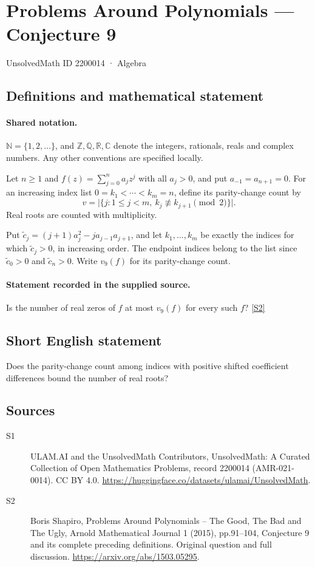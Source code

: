 \documentclass[11pt]{article}
\newcommand{\sref}[2]{\hyperlink{source:#1:#2}{[S#2]}}
\begin{document}
\setcounter{section}{2200013}
\section{Problems Around Polynomials — Conjecture 9}\label{2200014}
{\small\sffamily UnsolvedMath ID 2200014 · Algebra}
\subsection{Definitions and mathematical statement}

\paragraph{Shared notation.}$\mathbb N=\{1,2,\ldots\}$, and $\mathbb Z,\mathbb Q,\mathbb R,\mathbb C$ denote the integers, rationals, reals and complex numbers. Any other conventions are specified locally.


Let $n\geq1$ and $f(z)=\sum_{j=0}^n a_jz^j$ with all $a_j>0$, and put $a_{-1}=a_{n+1}=0$. For an increasing index list $0=k_1<\cdots<k_m=n$, define its parity-change count by
\[v=\bigl|\{j:1\leq j<m,\ k_j\not\equiv k_{j+1}\pmod2\}\bigr|.\]
Real roots are counted with multiplicity.\par Put $\widetilde c_j=(j+1)a_j^2-ja_{j-1}a_{j+1}$, and let $k_1,\ldots,k_m$ be exactly the indices for which $\widetilde c_j>0$, in increasing order. The endpoint indices belong to the list since $\widetilde c_0>0$ and $\widetilde c_n>0$. Write $v_9(f)$ for its parity-change count.
\paragraph{Statement recorded in the supplied source.}
Is the number of real zeros of $f$ at most $v_9(f)$ for every such $f$? \sref{2200014}{2}
\subsection{Short English statement}
Does the parity-change count among indices with positive shifted coefficient differences bound the number of real roots?
\subsection{Sources}
\begin{description}
\item[\hypertarget{source:2200014:1}{S1}] ULAM.AI and the UnsolvedMath Contributors, UnsolvedMath: A Curated Collection of Open Mathematics Problems, record 2200014 (AMR-021-0014). CC BY 4.0. \url{https://huggingface.co/datasets/ulamai/UnsolvedMath}.
\item[\hypertarget{source:2200014:2}{S2}] Boris Shapiro, Problems Around Polynomials -- The Good, The Bad and The Ugly, Arnold Mathematical Journal 1 (2015), pp.91--104, Conjecture 9 and its complete preceding definitions. Original question and full discussion. \url{https://arxiv.org/abs/1503.05295}.

\end{description}
\label{end:2200014}
\end{document}
